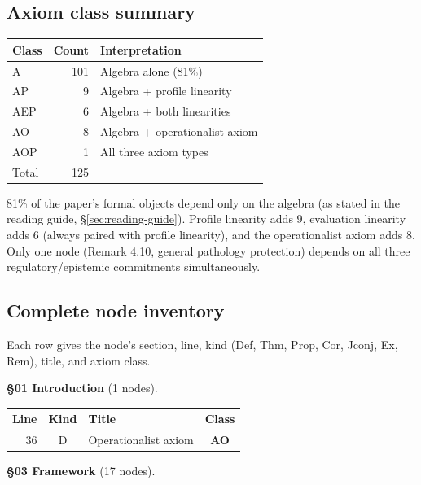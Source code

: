\subsection{Axiom class summary}

\begin{center}
\begin{tabular}{l|r|l}
\textbf{Class} & \textbf{Count} & \textbf{Interpretation} \\
\hline
\textsf{A} & 101 & Algebra alone (81\%) \\
\textsf{AP} & 9 & Algebra + profile linearity \\
\textsf{AEP} & 6 & Algebra + both linearities \\
\textsf{AO} & 8 & Algebra + operationalist axiom \\
\textsf{AOP} & 1 & All three axiom types \\
\hline
Total & 125 &
\end{tabular}
\end{center}

81\% of the paper's formal objects depend only on the
algebra (as stated in the reading guide,
\S\ref{sec:reading-guide}). Profile linearity adds 9, evaluation linearity
adds 6 (always paired with profile linearity), and the
operationalist axiom adds 8. Only one node
(Remark 4.10, general pathology protection) depends on
all three regulatory/epistemic commitments simultaneously.

\subsection{Complete node inventory}

Each row gives the node's section, line, kind
(\textsf{D}ef, \textsf{T}hm, \textsf{P}rop,
\textsf{C}or, \textsf{J}conj, \textsf{E}x,
\textsf{R}em), title, and axiom class.


\medskip
\noindent\textbf{\S01 Introduction} (1 nodes).

\begin{center}
\scriptsize
\begin{tabular}{r|c|l|c}
\textbf{Line} & \textbf{Kind} & \textbf{Title} & \textbf{Class} \\
\hline
36 & \textsf{D} & Operationalist axiom & \textbf{AO} \\
\end{tabular}
\end{center}

\medskip
\noindent\textbf{\S03 Framework} (17 nodes).

